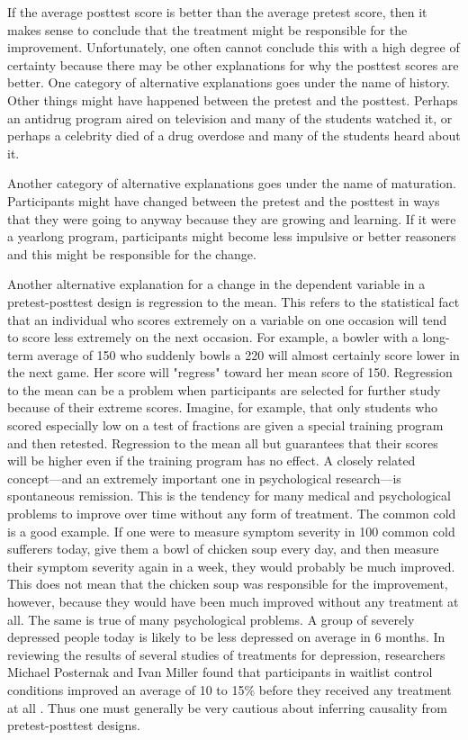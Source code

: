 If the average posttest score is better than the average pretest score, then it makes sense to conclude that the treatment might be responsible for the improvement. Unfortunately, one often cannot conclude this with a high degree of certainty because there may be other explanations for why the posttest scores are better. One category of alternative explanations goes under the name of history. Other things might have happened between the pretest and the posttest. Perhaps an antidrug program aired on television and many of the students watched it, or perhaps a celebrity died of a drug overdose and many of the students heard about it. 

Another category of alternative explanations goes under the name of maturation. Participants might have changed between the pretest and the posttest in ways that they were going to anyway because they are growing and learning. If it were a yearlong program, participants might become less impulsive or better reasoners and this might be responsible for the change.

Another alternative explanation for a change in the dependent variable in a pretest-posttest design is regression to the mean. This refers to the statistical fact that an individual who scores extremely on a variable on one occasion will tend to score less extremely on the next occasion. For example, a bowler with a long-term average of 150 who suddenly bowls a 220 will almost certainly score lower in the next game. Her score will "regress" toward her mean score of 150. Regression to the mean can be a problem when participants are selected for further study because of their extreme scores. Imagine, for example, that only students who scored especially low on a test of fractions are given a special training program and then retested. Regression to the mean all but guarantees that their scores will be higher even if the training program has no effect. A closely related concept---and an extremely important one in psychological research---is spontaneous remission. This is the tendency for many medical and psychological problems to improve over time without any form of treatment. The common cold is a good example. If one were to measure symptom severity in 100 common cold sufferers today, give them a bowl of chicken soup every day, and then measure their symptom severity again in a week, they would probably be much improved. This does not mean that the chicken soup was responsible for the improvement, however, because they would have been much improved without any treatment at all. The same is true of many psychological problems. A group of severely depressed people today is likely to be less depressed on average in 6 months. In reviewing the results of several studies of treatments for depression, researchers Michael Posternak and Ivan Miller found that participants in waitlist control conditions improved an average of 10 to 15\% before they received any treatment at all \citep{posternak_untreated_2001}. Thus one must generally be very cautious about inferring causality from pretest-posttest designs.

